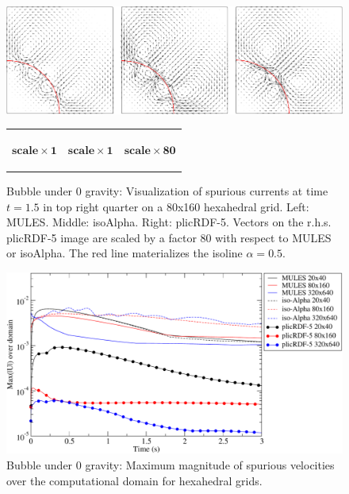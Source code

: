 \documentclass[review]{elsarticle}
\begin{document}
\begin{figure}[!h]
 \begin{center}
   \vspace{-1mm}
   \includegraphics[width=\textwidth]{figures/spuriousCurrents_OFall_time=1p5_080x160_quarter.png}
 \end{center}
 \vspace{-11mm}
 \begin{tabular}{p{}p{}p{}}
    \begin{center}
    $\mathbf{scale \times 1}$
    \end{center} 
    & 
    \begin{center}
    $\mathbf{scale \times 1}$ 
    \end{center} 
    & 
    \begin{center}
    $\mathbf{scale \times 80}$
    \end{center}
    \\
 \end{tabular}
 \vspace{-11mm}
\caption{Bubble under 0 gravity: Visualization of spurious currents at time $t=1.5$ in top right quarter on a 80x160 hexahedral grid. Left: MULES. Middle: isoAlpha. Right: plicRDF-5. Vectors on the r.h.s. plicRDF-5 image are scaled by a factor 80 with respect to MULES or isoAlpha. The red line materializes the isoline $\alpha=0.5$.}
\label{fig:spuriousCurrents_velocityField}
\end{figure}

\begin{figure}[!h]
  \includegraphics[width=\textwidth]{figures/spuriousCurrents_MaxmagU_compareOF_20_80_320_struct.pdf}
  \caption{Bubble under 0 gravity: Maximum magnitude of spurious velocities over the computational domain for hexahedral grids.}
  \label{fig:spuriousCurrents_MaxmagU_struct}
\end{figure}
\end{document}
